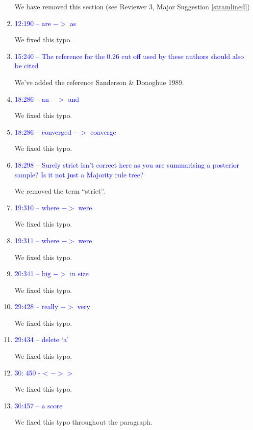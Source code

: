 \documentclass[12pt,letterpaper]{article}
\begin{document}
\begin{enumerate}
We have removed this section (see Reviewer 3, Major Suggestion \ref{stramlined})

\item{\textcolor{blue}{12:190 – are $->$ as}}

We fixed this typo.

\item{\textcolor{blue}{15:240 – The reference for the 0.26 cut off used by these authors should also be cited}}

We've added the reference Sanderson \& Donoghue 1989.

\item{\textcolor{blue}{18:286 – an $->$ and}}

We fixed this typo.

\item{\textcolor{blue}{18:286 – converged $->$ converge}}

We fixed this typo.

\item{\textcolor{blue}{18:298 – Surely strict isn't correct here as you are summarising a posterior sample? Is it not just a Majority rule tree?}}

We removed the term ``strict''.

\item{\textcolor{blue}{19:310 – where $->$ were}}

We fixed this typo.

\item{\textcolor{blue}{19:311 – where $->$ were}}

We fixed this typo.

\item{\textcolor{blue}{20:341 – big $->$ in size}}

We fixed this typo.

\item{\textcolor{blue}{29:428 – really $->$ very}}

We fixed this typo.

\item{\textcolor{blue}{29:434 – delete ‘a'}}

We fixed this typo.

\item{\textcolor{blue}{30: 450 - < $->$ >}}

We fixed this typo.

\item{\textcolor{blue}{30:457 – a score}}

We fixed this typo throughout the paragraph.


\end{enumerate}
\end{document}
